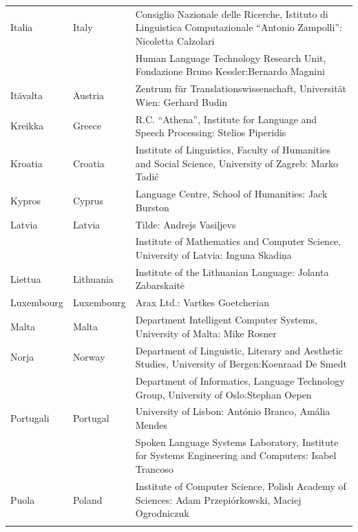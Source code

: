 \begin{longtable}{@{}llp{113mm}@{}}
Italia & \textcolor{grey1}{Italy} & Consiglio Nazionale delle Ricerche, Istituto di Linguistica Computazionale “Antonio Zampolli”: Nicoletta Calzolari\\ \addlinespace
  & & Human Language Technology Research Unit, Fondazione Bruno Kessler:\newline Bernardo Magnini\\ \addlinespace 
Itävalta & \textcolor{grey1}{Austria} & Zentrum für Translationswissenschaft, Universität Wien: Gerhard Budin\\ \addlinespace 
Kreikka & \textcolor{grey1}{Greece} & R.C. “Athena”, Institute for Language and Speech Processing: Stelios Piperidis\\ \addlinespace
Kroatia & \textcolor{grey1}{Croatia} & Institute of Linguistics, Faculty of Humanities and Social Science, University of Zagreb: Marko Tadić \\ \addlinespace
Kypros & \textcolor{grey1}{Cyprus} & Language Centre, School of Humanities: Jack Burston\\ \addlinespace
Latvia & \textcolor{grey1}{Latvia} & Tilde: Andrejs Vasiļjevs\\ \addlinespace 
  & & Institute of Mathematics and Computer Science, University of Latvia: Inguna Skadiņa\\ \addlinespace
Liettua & \textcolor{grey1}{Lithuania} & Institute of the Lithuanian Language: Jolanta Zabarskaitė\\ \addlinespace
Luxembourg & \textcolor{grey1}{Luxembourg} & Arax Ltd.: Vartkes Goetcherian\\ \addlinespace
Malta & \textcolor{grey1}{Malta} & Department Intelligent Computer Systems, University of Malta: Mike Rosner\\ \addlinespace
Norja & \textcolor{grey1}{Norway} & Department of Linguistic, Literary and Aesthetic Studies, University of Bergen:\newline Koenraad De Smedt\\ \addlinespace 
  & & Department of Informatics, Language Technology Group, University of Oslo:\newline Stephan Oepen \\ \addlinespace
Portugali & \textcolor{grey1}{Portugal} & University of Lisbon: António Branco, Amália Mendes \\ \addlinespace
  & & Spoken Language Systems Laboratory, Institute for Systems Engineering and Computers: Isabel Trancoso \\ \addlinespace
Puola & \textcolor{grey1}{Poland} & Institute of Computer Science, Polish Academy of Sciences: Adam Przepiórkowski, Maciej Ogrodniczuk \\ \addlinespace

\end{longtable}
